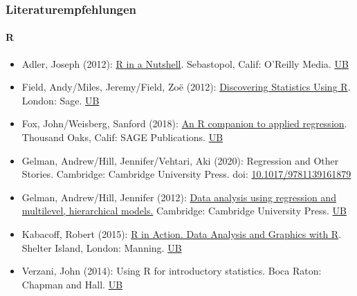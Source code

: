 \documentclass[
]{article}
\providecommand{\tightlist}{%
  \setlength{\itemsep}{0pt}\setlength{\parskip}{0pt}}
\begin{document}
\hypertarget{literaturempfehlungen}{%
\subsubsection{Literaturempfehlungen}\label{literaturempfehlungen}}

\hypertarget{r}{%
\paragraph{R}\label{r}}

\begin{itemize}
\tightlist
\item
  Adler, Joseph (2012):
  \href{https://www.oreilly.com/library/view/r-in-a/9781449358204/}{R in
  a Nutshell}. Sebastopol, Calif: O'Reilly Media.
  \href{https://stg.ibs-bw.de/aDISWeb/app?service=direct/0/Home/$DirectLink\&sp=SOPAC02\&sp=SAKSWB-IdNr1619328763}{UB}
\item
  Field, Andy/Miles, Jeremy/Field, Zoë (2012):
  \href{https://uk.sagepub.com/en-gb/eur/discovering-statistics-using-r/book236067}{Discovering
  Statistics Using R}. London: Sage.
  \href{https://stg.ibs-bw.de/aDISWeb/app?service=direct/0/Home/$DirectLink\&sp=SOPAC02\&sp=SAKSWB-IdNr68436977X}{UB}
\item
  Fox, John/Weisberg, Sanford (2018):
  \href{https://uk.sagepub.com/en-gb/eur/an-r-companion-to-applied-regression/book246125}{An
  R companion to applied regression}. Thousand Oaks, Calif: SAGE
  Publications.
  \href{https://stg.ibs-bw.de/aDISWeb/app?service=direct/0/Home/$DirectLink\&sp=SOPAC02\&sp=SAKSWB-IdNr1644736535}{UB}
\item
  Gelman, Andrew/Hill, Jennifer/Vehtari, Aki (2020): Regression and
  Other Stories. Cambridge: Cambridge University Press. doi:
  \href{https://www.cambridge.org/core/books/regression-and-other-stories/DD20DD6C9057118581076E54E40C372C}{10.1017/9781139161879}
\item
  Gelman, Andrew/Hill, Jennifer (2012):
  \href{https://www.cambridge.org/core/books/data-analysis-using-regression-and-multilevelhierarchical-models}{Data
  analysis using regression and multilevel, hierarchical models.}
  Cambridge: Cambridge University Press.
  \href{https://stg.ibs-bw.de/aDISWeb/app?service=direct/0/Home/$DirectLink\&sp=SOPAC02\&sp=SAKSWB-IdNr617446911}{UB}
\item
  Kabacoff, Robert (2015):
  \href{https://www.manning.com/books/r-in-action-second-edition}{R in
  Action. Data Analysis and Graphics with R}. Shelter Island, London:
  Manning.
  \href{https://stg.ibs-bw.de/aDISWeb/app?service=direct/0/Home/$DirectLink\&sp=SOPAC02\&sp=SAKSWB-IdNr798788666}{UB}
\item
  Verzani, John (2014): Using R for introductory statistics. Boca Raton:
  Chapman and Hall.
  \href{https://stg.ibs-bw.de/aDISWeb/app?service=direct/0/Home/$DirectLink\&sp=SOPAC02\&sp=SAKSWB-IdNr786091401}{UB}
\end{itemize}
\end{document}
